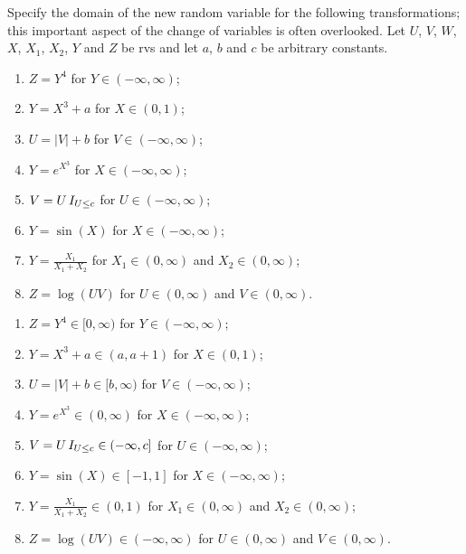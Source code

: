 \begin{exercise}
Specify the domain of the new random variable for the following transformations; this important aspect of the change of variables is often overlooked.
Let $U$, $V$, $W$, $X$, $X_1$, $X_2$, $Y$ and $Z$ be rvs and let $a$, $b$ and $c$ be arbitrary constants.
\begin{enumerate}
    \item $Z = Y^{4}$ for $Y \in (-\infty,\infty)$;
    \item $Y = X^{3}+a$ for $X \in (0,1)$;
    \item $U = |V|+b$ for $V \in (-\infty,\infty)$;
    \item $Y = e^{X^3}$ for $X \in (-\infty,\infty)$;
    \item $V = U \,I_{U \leq c}$ for $U \in (-\infty,\infty)$;
    \item $Y = \sin(X)$ for $X \in (-\infty,\infty)$;
    \item $Y = \frac{X_1}{X_1+X_2}$ for $X_1 \in (0,\infty)$ and $X_2 \in (0,\infty)$;
    \item $Z = \log(UV)$ for $U \in (0,\infty)$ and $V \in (0,\infty)$. \\
\end{enumerate}
\begin{solution}
\begin{enumerate}
    \item $Z = Y^{4} \in [0, \infty)$ for $Y \in (-\infty,\infty)$;
    \item $Y = X^{3}+a \in (a, a+1)$ for $X \in (0,1)$;
    \item $U = |V|+b \in [b, \infty)$ for $V \in (-\infty,\infty)$;
    \item $Y = e^{X^3} \in (0, \infty)$ for $X \in (-\infty,\infty)$;
    \item $V = U \,I_{U \leq c} \in (-\infty, c]$ for $U \in (-\infty,\infty)$;
    \item $Y = \sin(X) \in [-1, 1]$ for $X \in (-\infty,\infty)$;
    \item $Y = \frac{X_1}{X_1+X_2} \in (0, 1)$ for $X_1 \in (0,\infty)$ and $X_2 \in (0,\infty)$;
    \item $Z = \log(UV) \in (-\infty, \infty)$ for $U \in (0,\infty)$ and $V \in (0,\infty)$. \\
\end{enumerate}
\end{solution}

\end{exercise}

